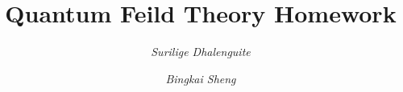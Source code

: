 \documentclass[12pt]{article}
\title{\textbf{Quantum Feild Theory Homework}}
\author{\emph{Surilige Dhalenguite} \and \emph{Bingkai Sheng}}
\begin{document}
\maketitle
\setlength{\parindent}{0pt}	%
\begin{spacing}{1.5}		%

\newcommand*{\dif}{\mathop{}\!\mathrm{d}} 		%



\end{spacing}
\end{document}
